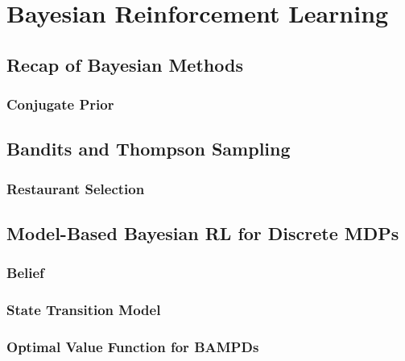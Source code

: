 \chapter{Bayesian Reinforcement Learning} %

	\section{Recap of Bayesian Methods} %

		\subsection{Conjugate Prior} %

	\section{Bandits and Thompson Sampling} %

		\subsection{Restaurant Selection} %

	\section{Model-Based Bayesian RL for Discrete MDPs} %

		\subsection{Belief} %

		\subsection{State Transition Model} %

		\subsection{Optimal Value Function for BAMPDs} %

